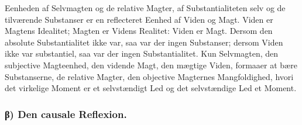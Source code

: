 \documentclass[11pt]{book}
\newcommand{\opage}[1]{\marginnote{\footnotesize\textit{[#1]}}}
\begin{document}
Eenheden af Selvmagten og de relative Magter, af Substantialiteten selv
og de tilværende Substanser er en reflecteret Eenhed af Viden og Magt.
Viden er Magtens Idealitet; Magten er Videns Realitet: Viden er Magt.
Dersom den absolute Substantialitet ikke var, saa var der ingen
Substanser; dersom Viden ikke var substantiel, saa var der ingen
Substantialitet. Kun Selvmagten, den subjective Magteenhed, den vidende
Magt, den mægtige Viden, formaaer at bære Substanserne, de relative
Magter, den objective Magternes Mangfoldighed, hvori det virkelige Moment
er et selvstændigt Led og det selvstændige Led et Moment.

\opage{114} \setcounter{footnote}{0}%
\subsubsection*{β) Den causale Reflexion.}
\end{document}
